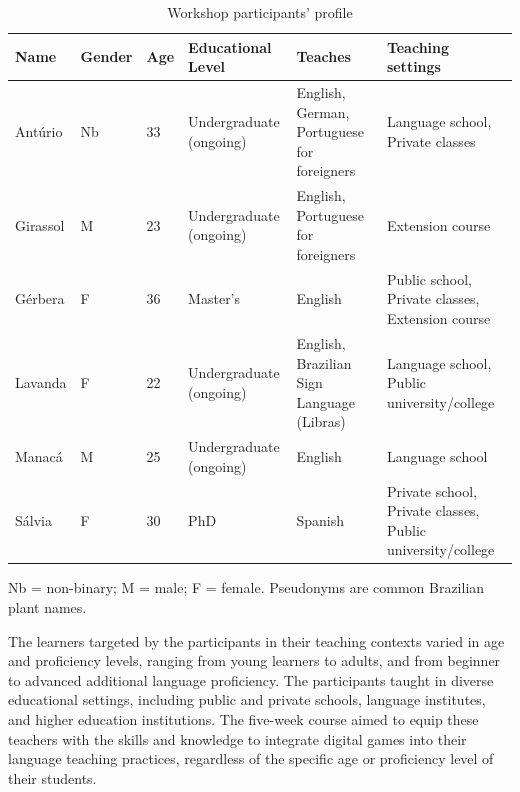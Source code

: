 \documentclass[english]{textolivre}
\begin{document}
\begin{table}[h!]
\begin{threeparttable}
\caption{Workshop participants’ profile}
\label{tab1}
\small
\centering
\begin{tabular}{p{1cm} p{1cm} p{1cm} p{} p{3cm} p{}}
\hline
Name & Gender & Age & Educational Level & Teaches & Teaching settings \\
\hline
Antúrio & Nb & 33 & Undergraduate (ongoing) &
English, German, Portuguese for foreigners & Language school, Private classes \\

Girassol & M & 23 & Undergraduate (ongoing) &
English, Portuguese for foreigners & Extension course \\

Gérbera & F & 36 & Master’s &
English & Public school, Private classes, Extension course \\

Lavanda & F & 22 & Undergraduate (ongoing) &
English, Brazilian Sign Language (Libras) & Language school, Public university/college \\

Manacá & M & 25 & Undergraduate (ongoing) &
English & Language school \\

Sálvia & F & 30 & PhD &
Spanish & Private school, Private classes, Public university/college \\
\hline
\end{tabular}

\vspace{0.3cm}

\footnotesize
\begin{tablenotes}
\small{
\item{Nb = non-binary; M = male; F = female. Pseudonyms are common Brazilian plant names.}
 }
\end{tablenotes}
\end{threeparttable}
\end{table}

The learners targeted by the participants in their teaching contexts varied in age and proficiency levels, ranging from young learners to adults, and from beginner to advanced additional language proficiency. The participants taught in diverse educational settings, including public and private schools, language institutes, and higher education institutions. The five-week course aimed to equip these teachers with the skills and knowledge to integrate digital games into their language teaching practices, regardless of the specific age or proficiency level of their students.
\end{document}
